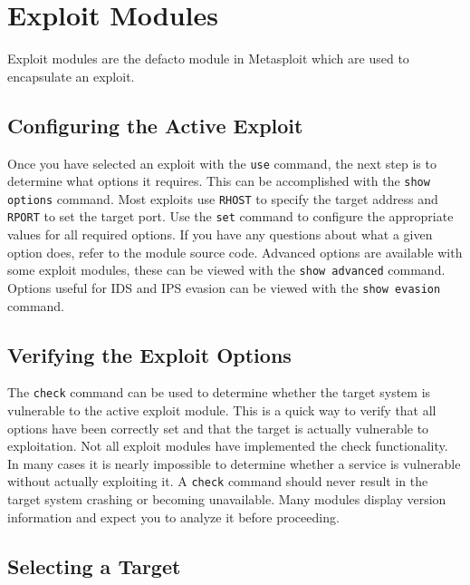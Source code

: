 \documentclass{report}
\begin{document}
	\section{Exploit Modules}

\par
Exploit modules are the defacto module in Metasploit which are used to
encapsulate an exploit.

		\subsection{Configuring the Active Exploit}

\par 
Once you have selected an exploit with the \texttt{use} command, the next step
is to determine what options it requires. This can be accomplished with the
\texttt{show options} command. Most exploits use \texttt{RHOST} to specify the
target address and \texttt{RPORT} to set the target port. Use the \texttt{set}
command to configure the appropriate values for all required options. If you
have any questions about what a given option does, refer to the module source
code.  Advanced options are available with some exploit modules, these can be
viewed with the \texttt{show advanced} command. Options useful for IDS and IPS
evasion can be viewed with the \texttt{show evasion} command.

		\subsection{Verifying the Exploit Options}

\par	
The \texttt{check} command can be used to determine whether the target
system is vulnerable to the active exploit module. This is a quick way to
verify that all options have been correctly set and that the target is
actually vulnerable to exploitation. Not all exploit modules have implemented
the check functionality.  In many cases it is nearly impossible to determine
whether a service is vulnerable without actually exploiting it. A
\texttt{check} command should never result in the target system crashing or
becoming unavailable. Many modules display version information and
expect you to analyze it before proceeding.  

		\subsection{Selecting a Target}
\end{document}
